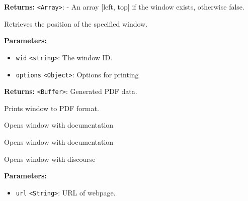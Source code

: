 \documentclass[12pt,a4paper]{article}
\begin{document}
\noindent \textbf{Returns:} \texttt{<Array>}: - An array [left, top] if the window exists, otherwise false.

\noindent Retrieves the position of the specified window.

\vspace{5mm}
\noindent {}


\noindent \textbf{Parameters:}
\begin{itemize}
  \item \texttt{wid} \texttt{<string>}: The window ID.
  \item \texttt{options} \texttt{<Object>}: Options for printing
\end{itemize}

\noindent \textbf{Returns:} \texttt{<Buffer>}: Generated PDF data.

\noindent Prints window to PDF format.

\vspace{5mm}
\noindent {}


\noindent Opens window with documentation

\vspace{5mm}
\noindent {}


\noindent Opens window with documentation

\vspace{5mm}
\noindent {}


\noindent Opens window with discourse

\vspace{5mm}
\noindent {}


\noindent \textbf{Parameters:}
\begin{itemize}
  \item \texttt{url} \texttt{<String>}: URL of webpage.
\end{itemize}
\end{document}
